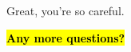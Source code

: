 \documentclass{article}
\begin{document}
\AR* \noindent \rm Great, you're so careful.

\hl{\large \bf Any more questions?}
	





	
\end{document}
